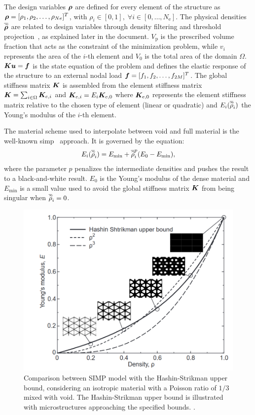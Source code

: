 The design variables $\bm{\rho}$ are defined for every element of the structure as $\bm{\rho} = [\rho_1, \rho_2, \ldots,\rho_{Ne}]^T$, with $\rho_i \in [0,1], \; \forall i \in [0,\dots,N_\text{e}]$. The physical densities $\bm{\overline{\widetilde{\rho}}}$ are related to design variables through density filtering and threshold projection~, as explained later in the document. $V_\text{p}$ is the prescribed volume fraction that acts as the constraint of the minimization problem, while $v_i$ represents the area of the $i$-th element and $V_0$ is the total area of the domain $\Omega$. $\bm{K}\bm{u} = \bm{f}$ is the state equation of the problem and defines the elastic response of the structure to an external nodal load $\bm{f}=[f_1, f_2, \ldots,f_{2M}]^T$. The global stiffness matrix $\bm{K}$ is assembled from the element stiffness matrix $\bm{K} = \sum_{i \in \Omega} \bm{K}_{e,i}$ and $\bm{K}_{e,i} = E_i \bm{K}_{e,0}$ where $\bm{K}_{e,0}$ represents the element stiffness matrix relative to the chosen type of element (linear or quadratic) and $E_i(\overline{\widetilde{\rho}}_i)$ the Young's modulus of the $i$-th element. 

The material scheme used to interpolate between void and full material is the well-known \gls{simp}~ approach. It is governed by the equation:
\begin{equation}
    E_i(\overline{\widetilde{\rho}}_i) = E_{\textrm{min}} + \overline{\widetilde{\rho}}_i^p(E_0-E_{\textrm{min}}),
    \label{eq:02_simp}
\end{equation}
where the parameter $p$ penalizes the intermediate densities and pushes the result to a black-and-white result. $E_0$ is the Young's modulus of the dense material and $E_{\textrm{min}}$ is a small value used to avoid the global stiffness matrix $\bm{K}$ from being singular when $\overline{\widetilde{\rho}}_i=0$.

\begin{figure}
    \centering
    \includegraphics[width=0.75\linewidth]{figures/02_literature/simp.png}
    \caption{Comparison between SIMP model with the Hashin-Strikman upper bound, considering an isotropic material with a Poisson ratio of $1/3$ mixed with void. The Hashin-Strikman upper bound is illustrated with microstructures approaching the specified bounds. \cite{bendsoe_material_1999}.}
    \label{fig:02_simp}
\end{figure}

